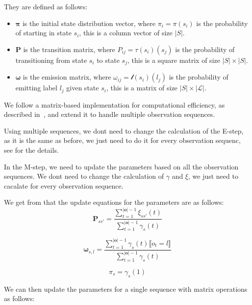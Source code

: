 They are defined as follows:
\begin{itemize}
    \item $\pmb{\pi}$ is the initial state distribution vector, where $\pi_i = \pi(s_i)$ is the probability of starting in state $s_i$, this is a column vector of size $|S|$.
    \item $\pmb{P}$ is the transition matrix, where $P_{ij} = \tau(s_i)(s_j)$ is the probability of transitioning from state $s_i$ to state $s_j$, this is a square matrix of size $|S| \times |S|$.
    \item $\pmb{\omega}$ is the emission matrix, where $\omega_{ij} = \mathscr{l}(s_i)(l_j)$ is the probability of emitting label $l_j$ given state $s_i$, this is a matrix of size $|S| \times |\mathcal{L}|$.
\end{itemize}

We follow a matrix-based implementation for computational efficiency, as described in~\cite{aaholmbaum}, and extend it to handle multiple observation sequences.

Using multiple sequences, we dont need to change the calculation of the E-step, as it is the same as before, we just need to do it for every observation sequenc, see \cite{Rabiner89} for the details.

In the M-step, we need to update the parameters based on all the observation sequences.
We dont need to change the calculation of $\gamma$ and $\xi$, we just need to cacalate for every observation sequence.

We get from \cite{aaholmbaum} that the update equations for the parameters are as follows:
\begin{equation}
    \pmb{P}_{s s'} = \frac{\sum_{t = 1}^{|\mathbf{o}|-1} \xi_{ss'}(t)}{\sum_{t = 1}^{|\mathbf{o}|-1} \gamma_s(t)}
    \label{eq:transition-probabilities}
\end{equation}

\begin{equation}
    \pmb{\omega}_{s, l} = \frac{\sum_{t = 1}^{|\mathbf{o}|-1} \gamma_s(t) \lBrack o_t = l \rBrack}{\sum_{t = 1}^{|\mathbf{o}|-1} \gamma_s(t)}
    \label{eq:omega}
\end{equation}

\begin{equation}
    \pi_s = \gamma_s(1)
    \label{eq:initial-probabilities}
\end{equation}

We can then update the parameters for a single sequence with matrix operations as follows:

